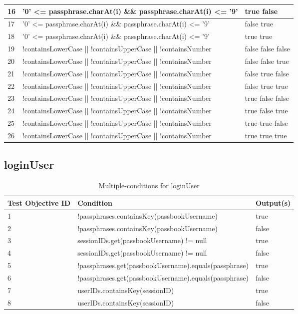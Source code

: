 \documentclass{article}
\begin{document}
\begin{longtable}{|p{2cm}|p{10cm}|p{3cm}|}
\hline
16&'0' <= passphrase.charAt(i) \&\& passphrase.charAt(i) <= '9'&true false\\
\hline
17&'0' <= passphrase.charAt(i) \&\& passphrase.charAt(i) <= '9'&false true\\
\hline
18&'0' <= passphrase.charAt(i) \&\& passphrase.charAt(i) <= '9'&true true\\
\hline
19&!containsLowerCase || !containsUpperCase || !containsNumber&false false false\\
\hline
20&!containsLowerCase || !containsUpperCase || !containsNumber&false false true\\
\hline
21&!containsLowerCase || !containsUpperCase || !containsNumber&false true false\\
\hline
22&!containsLowerCase || !containsUpperCase || !containsNumber&false true true\\
\hline
23&!containsLowerCase || !containsUpperCase || !containsNumber&true false false\\
\hline
24&!containsLowerCase || !containsUpperCase || !containsNumber&true false true\\
\hline
25&!containsLowerCase || !containsUpperCase || !containsNumber&true true false\\
\hline
26&!containsLowerCase || !containsUpperCase || !containsNumber&true true true\\
\hline
\end{longtable}

\subsection{loginUser}
\begin{longtable}{|p{2cm}|p{10cm}|p{3cm}|}
\caption{Multiple-conditions for loginUser}\\
\hline 
Test Objective ID&Condition&Output(s)\\
\hline  
1&!passphrases.containsKey(passbookUsername)&true\\
\hline
2&!passphrases.containsKey(passbookUsername)&false\\
\hline
3&sessionIDs.get(passbookUsername) != null&true\\
\hline
4&sessionIDs.get(passbookUsername) != null&false\\
\hline
5&!passphrases.get(passbookUsername).equals(passphrase)&true\\
\hline
6&!passphrases.get(passbookUsername).equals(passphrase)&false\\
\hline
7&userIDs.containsKey(sessionID)&true\\
\hline
8&userIDs.containsKey(sessionID)&false\\
\hline
\end{longtable}
\end{document}
